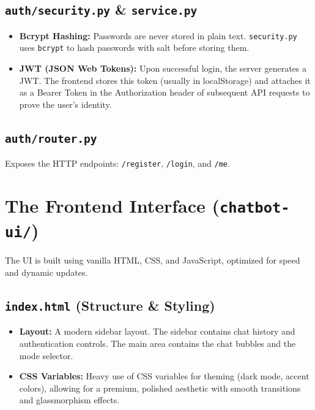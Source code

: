 \documentclass[12pt, a4paper]{report}
\begin{document}
\section{\texttt{auth/security.py} \& \texttt{service.py}}
\begin{itemize}
    \item \textbf{Bcrypt Hashing:} Passwords are never stored in plain text. \texttt{security.py} uses \texttt{bcrypt} to hash passwords with salt before storing them.
    \item \textbf{JWT (JSON Web Tokens):} Upon successful login, the server generates a JWT. The frontend stores this token (usually in localStorage) and attaches it as a Bearer Token in the Authorization header of subsequent API requests to prove the user's identity.
\end{itemize}

\section{\texttt{auth/router.py}}
Exposes the HTTP endpoints: \texttt{/register}, \texttt{/login}, and \texttt{/me}.

\newpage

\chapter{The Frontend Interface (\texttt{chatbot-ui/})}

The UI is built using vanilla HTML, CSS, and JavaScript, optimized for speed and dynamic updates.

\section{\texttt{index.html} (Structure \& Styling)}
\begin{itemize}
    \item \textbf{Layout:} A modern sidebar layout. The sidebar contains chat history and authentication controls. The main area contains the chat bubbles and the mode selector.
    \item \textbf{CSS Variables:} Heavy use of CSS variables for theming (dark mode, accent colors), allowing for a premium, polished aesthetic with smooth transitions and glassmorphism effects.
\end{itemize}
\end{document}
